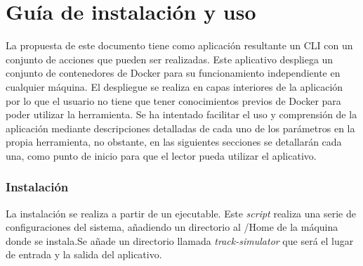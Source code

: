 
\chapter{Guía de instalación y uso} \label{chapter:GuiaUso}
La propuesta de este documento tiene como aplicación resultante un \ac{CLI} con un conjunto de acciones que pueden ser realizadas. Este aplicativo despliega un conjunto de contenedores de Docker para su funcionamiento independiente en cualquier máquina. El despliegue se realiza en capas interiores de la aplicación por lo que el usuario no tiene que tener conocimientos previos de Docker para poder utilizar la herramienta. Se ha intentado facilitar el uso y comprensión de la aplicación mediante descripciones detalladas de cada uno de los parámetros en la propia herramienta, no obstante, en las siguientes secciones se detallarán cada una, como punto de inicio para que el lector pueda utilizar el aplicativo.

\subsection{Instalación}
La instalación se realiza a partir de un ejecutable. Este \textit{script} realiza una serie de configuraciones del sistema, añadiendo un directorio al \slash Home de la máquina donde se instala.Se añade un directorio llamada \textit{track-simulator} que será el lugar de entrada y la salida del aplicativo. 

